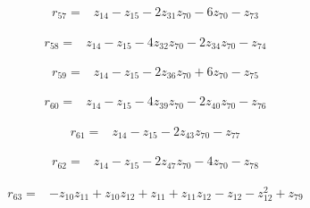 \par\noindent\begin{minipage}{\linewidth}
\begin{align*}
r_{57}={}&z_{14}-z_{15}-2z_{31}z_{70}-6z_{70}-z_{73}
\end{align*}
\end{minipage}\par
\par\noindent\begin{minipage}{\linewidth}
\begin{align*}
r_{58}={}&z_{14}-z_{15}-4z_{32}z_{70}-2z_{34}z_{70}-z_{74}
\end{align*}
\end{minipage}\par
\par\noindent\begin{minipage}{\linewidth}
\begin{align*}
r_{59}={}&z_{14}-z_{15}-2z_{36}z_{70}+6z_{70}-z_{75}
\end{align*}
\end{minipage}\par
\par\noindent\begin{minipage}{\linewidth}
\begin{align*}
r_{60}={}&z_{14}-z_{15}-4z_{39}z_{70}-2z_{40}z_{70}-z_{76}
\end{align*}
\end{minipage}\par
\par\noindent\begin{minipage}{\linewidth}
\begin{align*}
r_{61}={}&z_{14}-z_{15}-2z_{43}z_{70}-z_{77}
\end{align*}
\end{minipage}\par
\par\noindent\begin{minipage}{\linewidth}
\begin{align*}
r_{62}={}&z_{14}-z_{15}-2z_{47}z_{70}-4z_{70}-z_{78}
\end{align*}
\end{minipage}\par
\par\noindent\begin{minipage}{\linewidth}
\begin{align*}
r_{63}={}&-z_{10}z_{11}+z_{10}z_{12}+z_{11}+z_{11}z_{12}-z_{12}-z_{12}^{2}+z_{79}
\end{align*}
\end{minipage}\par
